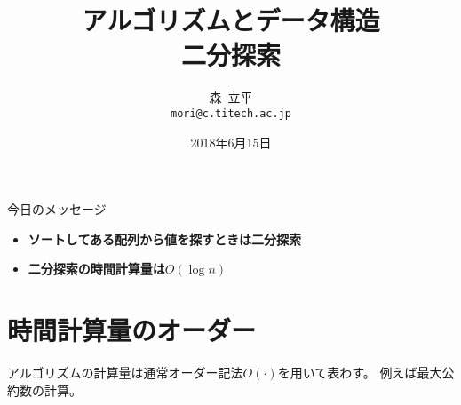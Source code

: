 \documentclass[a4paper,twoside,onecolumn,openany,article,10pt]{memoir}
\title{アルゴリズムとデータ構造\\\vspace{.5em} \Large 二分探索}
\date{2018年6月15日}
\author{森~立平\\ \texttt{mori@c.titech.ac.jp}}
\theoremstyle{remark}
\begin{document}
\maketitle


\noindent
今日のメッセージ
\begin{itemize}
\item \textbf{ソートしてある配列から値を探すときは二分探索}
\item \textbf{二分探索の時間計算量は$O(\log n)$}
\end{itemize}

%
%

\section{時間計算量のオーダー}
アルゴリズムの計算量は通常オーダー記法$O(\cdot)$を用いて表わす。
例えば最大公約数の計算。
\end{document}
